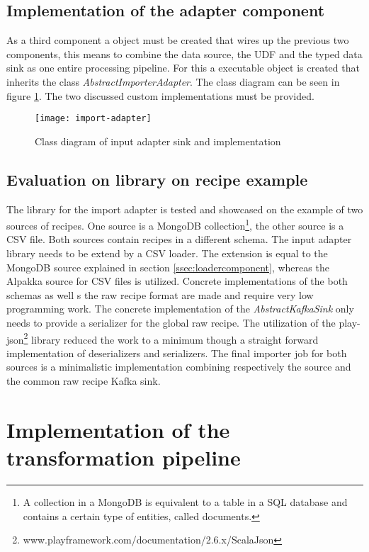 \subsection{Implementation of the adapter component}

As a third component a object must be created that wires up the previous two components, this means to combine the data source, the UDF and the typed data sink as one entire processing pipeline. For this a executable object is created that inherits the class \textit{AbstractImporterAdapter}. The class diagram can be seen in figure \ref{fig:import-adapter}. The two discussed custom implementations must be provided.

\begin{figure}[htb]
  \centering
  \texttt{[image: import-adapter]}\\
  \caption{Class diagram of input adapter sink and implementation}
  \label{fig:import-adapter}
\end{figure}

\subsection{Evaluation on library on recipe example}
The library for the import adapter is tested and showcased on the example of two sources of recipes. One source is a MongoDB collection\footnote{A collection in a MongoDB is equivalent to a table in a SQL database and contains a certain type of entities, called documents.}, the other source is a CSV file. Both sources contain recipes in a different schema. The input adapter library needs to be extend by a CSV loader. The extension is equal to the MongoDB source explained in section \ref{ssec:loadercomponent}, whereas the Alpakka source for CSV files is utilized. Concrete implementations of the both schemas as well s the raw recipe format are made and require very low programming work. The concrete implementation of the \textit{AbstractKafkaSink} only needs to provide a serializer for the global raw recipe. The utilization of the play-json\footnote{www.playframework.com/documentation/2.6.x/ScalaJson} library reduced the work to a minimum though a straight forward implementation of deserializers and serializers. The final importer job for both sources is a minimalistic implementation combining respectively the source and the common raw recipe Kafka sink.

\section{Implementation of the transformation pipeline}

